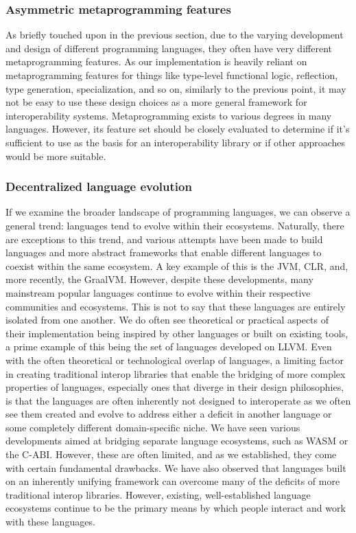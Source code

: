\subsubsection{Asymmetric metaprogramming features}

As briefly touched upon in the previous section, due to the varying development and design of different programming languages, they often have very different metaprogramming features. As our implementation is heavily reliant on metaprogramming features for things like type-level functional logic, reflection, type generation, specialization, and so on, similarly to the previous point, it may not be easy to use these design choices as a more general framework for interoperability systems. Metaprogramming exists to various degrees in many languages. However, its feature set should be closely evaluated to determine if it's sufficient to use as the basis for an interoperability library or if other approaches would be more suitable.

\subsubsection{Decentralized language evolution}

If we examine the broader landscape of programming languages, we can observe a general trend: languages tend to evolve within their ecosystems. Naturally, there are exceptions to this trend, and various attempts have been made to build languages and more abstract frameworks that enable different languages to coexist within the same ecosystem. A key example of this is the JVM, CLR, and, more recently, the GraalVM. However, despite these developments, many mainstream popular languages continue to evolve within their respective communities and ecosystems. This is not to say that these languages are entirely isolated from one another. We do often see theoretical or practical aspects of their implementation being inspired by other languages or built on existing tools, a prime example of this being the set of languages developed on LLVM. Even with the often theoretical or technological overlap of languages, a limiting factor in creating traditional interop libraries that enable the bridging of more complex properties of languages, especially ones that diverge in their design philosophies, is that the languages are often inherently not designed to interoperate as we often see them created and evolve to address either a deficit in another language or some completely different domain-specific niche. We have seen various developments aimed at bridging separate language ecosystems, such as WASM or the C-ABI. However, these are often limited, and as we established, they come with certain fundamental drawbacks. We have also observed that languages built on an inherently unifying framework can overcome many of the deficits of more traditional interop libraries. However, existing, well-established language ecosystems continue to be the primary means by which people interact and work with these languages.  

